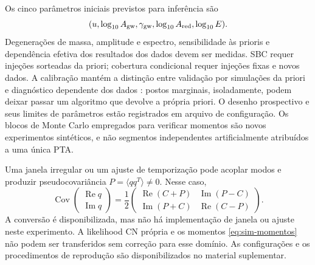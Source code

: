 Os cinco parâmetros iniciais previstos para inferência são
\[
(u,\log_{10}A_{\rm gw},\gamma_{\rm gw},
\log_{10}A_{\rm red},\log_{10}E).
\]
Degenerações de massa, amplitude
e espectro, sensibilidade às prioris e dependência efetiva dos resultados
dos dados devem ser medidas. SBC requer injeções sorteadas da priori;
cobertura condicional requer injeções fixas e novos dados. A calibração mantém a distinção entre
validação por simulações da priori e diagnóstico dependente dos dados
\cite{talts2018,modrak2025}: postos marginais, isoladamente, podem deixar
passar um algoritmo que devolve a própria priori. O desenho prospectivo
e seus limites de parâmetros estão registrados em arquivo de configuração.
Os blocos de Monte Carlo empregados
para verificar momentos são novos experimentos sintéticos, e não
segmentos independentes artificialmente atribuídos a uma única PTA.

Uma janela irregular ou um ajuste de temporização pode acoplar modos e
produzir pseudocovariância \(P=\langle qq^T\rangle\ne0\). Nesse caso,
\begin{equation}
 \operatorname{Cov}\begin{pmatrix}\operatorname{Re}q\\
                                  \operatorname{Im}q\end{pmatrix}
 =\frac12\begin{pmatrix}
  \operatorname{Re}(C+P)&\operatorname{Im}(P-C)\\
  \operatorname{Im}(P+C)&\operatorname{Re}(C-P)
 \end{pmatrix}.
 \label{eq:sim-cov-real}
\end{equation}
A conversão é disponibilizada, mas não há implementação de janela ou
ajuste neste experimento. A likelihood CN própria e os momentos
\eqref{eq:sim-momentos} não podem ser transferidos sem correção para
esse domínio. As configurações e os procedimentos de reprodução são disponibilizados no material suplementar.
